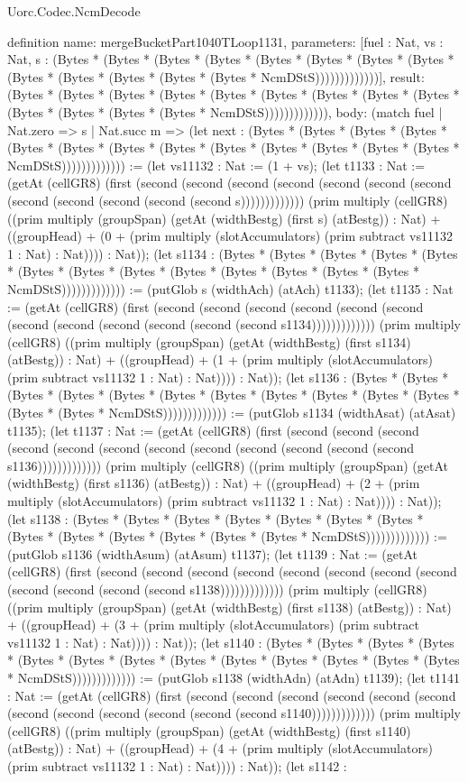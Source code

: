 \begin{lexlean}{Uorc.Codec.NcmDecode}
\begin{semanticmodule}
definition{
  name: mergeBucketPart1040TLoop1131,
  parameters: [fuel : Nat, vs : Nat, s : (Bytes * (Bytes * (Bytes * (Bytes * (Bytes * (Bytes * (Bytes * (Bytes * (Bytes * (Bytes * (Bytes * (Bytes * (Bytes * NcmDStS)))))))))))))],
  result: (Bytes * (Bytes * (Bytes * (Bytes * (Bytes * (Bytes * (Bytes * (Bytes * (Bytes * (Bytes * (Bytes * (Bytes * (Bytes * NcmDStS))))))))))))),
  body: (match fuel
    | Nat.zero => s
    | Nat.succ m => (let next : (Bytes * (Bytes * (Bytes * (Bytes * (Bytes * (Bytes * (Bytes * (Bytes * (Bytes * (Bytes * (Bytes * (Bytes * (Bytes * NcmDStS))))))))))))) := (let vs11132 : Nat := (1 + vs); (let t1133 : Nat := (getAt (cellGR8) (first (second (second (second (second (second (second (second (second (second (second (second (second s))))))))))))) (prim multiply (cellGR8) ((prim multiply (groupSpan) (getAt (widthBestg) (first s) (atBestg)) : Nat) + ((groupHead) + (0 + (prim multiply (slotAccumulators) (prim subtract vs11132 1 : Nat) : Nat)))) : Nat)); (let s1134 : (Bytes * (Bytes * (Bytes * (Bytes * (Bytes * (Bytes * (Bytes * (Bytes * (Bytes * (Bytes * (Bytes * (Bytes * (Bytes * NcmDStS))))))))))))) := (putGlob s (widthAch) (atAch) t1133); (let t1135 : Nat := (getAt (cellGR8) (first (second (second (second (second (second (second (second (second (second (second (second (second s1134))))))))))))) (prim multiply (cellGR8) ((prim multiply (groupSpan) (getAt (widthBestg) (first s1134) (atBestg)) : Nat) + ((groupHead) + (1 + (prim multiply (slotAccumulators) (prim subtract vs11132 1 : Nat) : Nat)))) : Nat)); (let s1136 : (Bytes * (Bytes * (Bytes * (Bytes * (Bytes * (Bytes * (Bytes * (Bytes * (Bytes * (Bytes * (Bytes * (Bytes * (Bytes * NcmDStS))))))))))))) := (putGlob s1134 (widthAsat) (atAsat) t1135); (let t1137 : Nat := (getAt (cellGR8) (first (second (second (second (second (second (second (second (second (second (second (second (second s1136))))))))))))) (prim multiply (cellGR8) ((prim multiply (groupSpan) (getAt (widthBestg) (first s1136) (atBestg)) : Nat) + ((groupHead) + (2 + (prim multiply (slotAccumulators) (prim subtract vs11132 1 : Nat) : Nat)))) : Nat)); (let s1138 : (Bytes * (Bytes * (Bytes * (Bytes * (Bytes * (Bytes * (Bytes * (Bytes * (Bytes * (Bytes * (Bytes * (Bytes * (Bytes * NcmDStS))))))))))))) := (putGlob s1136 (widthAsum) (atAsum) t1137); (let t1139 : Nat := (getAt (cellGR8) (first (second (second (second (second (second (second (second (second (second (second (second (second s1138))))))))))))) (prim multiply (cellGR8) ((prim multiply (groupSpan) (getAt (widthBestg) (first s1138) (atBestg)) : Nat) + ((groupHead) + (3 + (prim multiply (slotAccumulators) (prim subtract vs11132 1 : Nat) : Nat)))) : Nat)); (let s1140 : (Bytes * (Bytes * (Bytes * (Bytes * (Bytes * (Bytes * (Bytes * (Bytes * (Bytes * (Bytes * (Bytes * (Bytes * (Bytes * NcmDStS))))))))))))) := (putGlob s1138 (widthAdn) (atAdn) t1139); (let t1141 : Nat := (getAt (cellGR8) (first (second (second (second (second (second (second (second (second (second (second (second (second s1140))))))))))))) (prim multiply (cellGR8) ((prim multiply (groupSpan) (getAt (widthBestg) (first s1140) (atBestg)) : Nat) + ((groupHead) + (4 + (prim multiply (slotAccumulators) (prim subtract vs11132 1 : Nat) : Nat)))) : Nat)); (let s1142 : }
\end{semanticmodule}
\end{lexlean}
